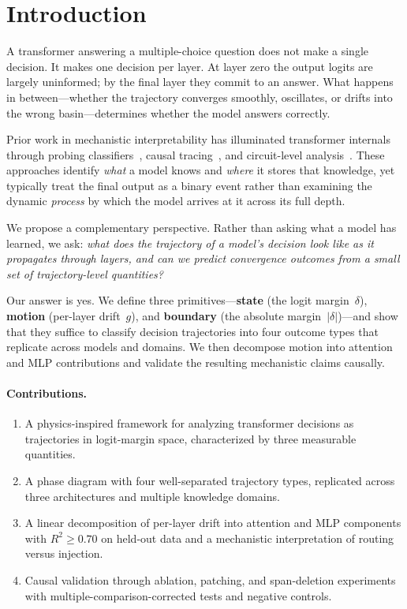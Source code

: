 \documentclass{article}
\begin{document}
\section{Introduction}

A transformer answering a multiple-choice question does not make a single decision.  It makes one decision per layer.  At layer zero the output logits are largely uninformed; by the final layer they commit to an answer.  What happens in between---whether the trajectory converges smoothly, oscillates, or drifts into the wrong basin---determines whether the model answers correctly.

Prior work in mechanistic interpretability has illuminated transformer internals through probing classifiers~\cite{belinkov2022}, causal tracing~\cite{meng2022}, and circuit-level analysis~\cite{olsson2022,conmy2023}.
These approaches identify \emph{what} a model knows and \emph{where} it stores that knowledge, yet typically treat the final output as a binary event rather than examining the dynamic \emph{process} by which the model arrives at it across its full depth.

We propose a complementary perspective.  Rather than asking what a model has learned, we ask: \emph{what does the trajectory of a model's decision look like as it propagates through layers, and can we predict convergence outcomes from a small set of trajectory-level quantities?}

Our answer is yes.  We define three primitives---\textbf{state} (the logit margin~$\delta$), \textbf{motion} (per-layer drift~$g$), and \textbf{boundary} (the absolute margin~$|\delta|$)---and show that they suffice to classify decision trajectories into four outcome types that replicate across models and domains.  We then decompose motion into attention and MLP contributions and validate the resulting mechanistic claims causally.

\paragraph{Contributions.}
\begin{enumerate}
\item A physics-inspired framework for analyzing transformer decisions as trajectories in logit-margin space, characterized by three measurable quantities.
\item A phase diagram with four well-separated trajectory types, replicated across three architectures and multiple knowledge domains.
\item A linear decomposition of per-layer drift into attention and MLP components with $R^2 \geq 0.70$ on held-out data and a mechanistic interpretation of routing versus injection.
\item Causal validation through ablation, patching, and span-deletion experiments with multiple-comparison-corrected tests and negative controls.
\end{enumerate}
\end{document}
